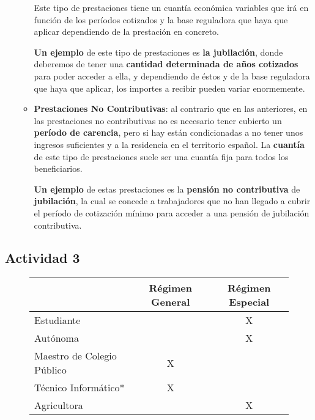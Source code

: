 \begin{enumerate}[label=\alph*)]
\begin{itemize}
        Este tipo de prestaciones tiene un cuantía económica variables que irá en función de los períodos cotizados y la base reguladora que haya que aplicar dependiendo de la prestación en concreto.

        \textbf{Un ejemplo} de este tipo de prestaciones es \textbf{la jubilación}, donde deberemos de tener una \textbf{cantidad determinada de años cotizados} para poder acceder a ella, y dependiendo de éstos y de la base reguladora que haya que aplicar, los importes a recibir pueden variar enormemente.

        \item \textbf{Prestaciones No Contributivas}: al contrario que en las anteriores, en las prestaciones no contributivas no es necesario tener cubierto un \textbf{período de carencia}, pero si hay están condicionadas a no tener unos ingresos suficientes y a la residencia en el territorio español. La \textbf{cuantía} de este tipo de prestaciones suele ser una cuantía fija para todos los beneficiarios.

        \textbf{Un ejemplo} de estas prestaciones es la \textbf{pensión no contributiva} de \textbf{jubilación}, la cual se concede a trabajadores que no han llegado a cubrir el período de cotización mínimo para acceder a una pensión de jubilación contributiva.
    \end{itemize}
\end{enumerate}

\subsection{Actividad 3}

    \begin{figure}[ht]

    \vspace{3ex}
    \centering

    \setlength{\tabcolsep}{10pt}
    \renewcommand{\arraystretch}{1.4}

    \begin{tabular}{| l | c | c |}
        \hline
         {} & \textbf{Régimen General} & \textbf{Régimen Especial} \\ \hline
        \centering Estudiante &   & X \\
        \hline
        \centering Autónoma &   & X \\
        \hline
        \centering Maestro de Colegio Público &  X &  \\
        \hline
        \centering Técnico Informático* &  X &  \\
        \hline
        \centering Agricultora &   & X \\
        \hline
    \end{tabular}
\end{figure}

